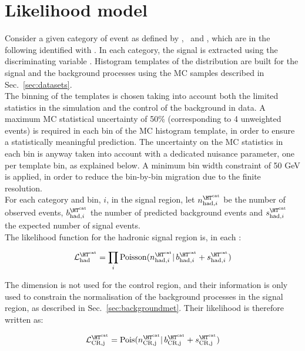 \section{Likelihood model}
\label{sec:likelihood}

Consider a given category of event as defined by \njet, \nb~and \scalht, which are in the following identified with \htcat. 
In each category, the signal is extracted using the discriminating variable \mht. 
Histogram templates of the \mht distribution are built for the signal and the background processes 
using the MC samples described in Sec.~\ref{sec:datasets}. \\
The binning of the templates is chosen taking into account both the limited statistics in the simulation and 
the control of the background in data. 
A maximum MC statistical uncertainty of 50\% (corresponding to 4 unweighted events) is required in each bin of the MC histogram template, 
in order to ensure a statistically meaningful prediction. The uncertainty on the MC statistics in each bin is anyway 
taken into account with a dedicated nuisance parameter, one per template bin, as explained below. 
A minimum bin width constraint of 50 GeV is applied, 
in order to reduce the bin-by-bin migration due to the finite \mht resolution.\\

For each category \htcat and \mht bin, $i$, in the signal region, let $n^{\htcat}_{\mathrm{had},i}$ be the number of observed events, 
$b^{\htcat}_{\mathrm{had},i}$ the number of predicted background events and $s^{\htcat}_{\mathrm{had},i}$ the expected number of signal events. \\
The likelihood function for the hadronic signal region is, in each \htcat:

\begin{equation}
\mathcal{L}^{\htcat}_{\mathrm{had}}=\prod_i \mathrm{Poisson}(n^{\htcat}_{\mathrm{had},i} |\, b^{\htcat}_{\mathrm{had},i} + s^{\htcat}_{\mathrm{had},i})
\label{eq:hadronicLikelihood}
\end{equation}

The \mht dimension is not used for the control region, and their information is only used to constrain the normalisation of the background processes 
in the signal region, as described in Sec.~\ref{sec:backgroundmet}. 
Their likelihood is therefore written as:

\begin{equation}
\mathcal{L}^{\htcat}_{\mathrm{CR,j}}=\mathrm{Pois}(n^{\htcat}_{\mathrm{CR,j}} |\, b^{\htcat}_{\mathrm{CR,j}} + s^{\htcat}_{\mathrm{CR,j}})
\label{eq:controlLikelihood}
\end{equation}

